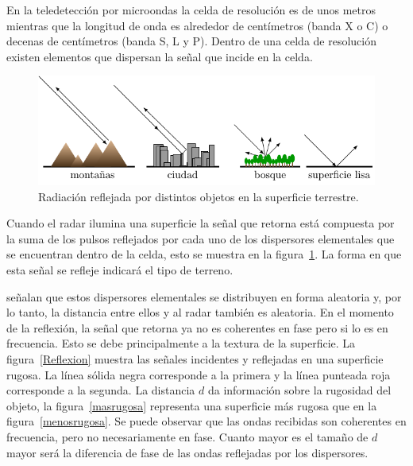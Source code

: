 
En la teledetección por microondas la celda de resolución es de unos metros mientras que la longitud de onda es alrededor de centímetros (banda X o C) o decenas de centímetros (banda S, L y P). Dentro de una celda de resolución existen elementos que dispersan la señal que incide en la celda.

\begin{figure}[hbt]
	\centering    
	\includegraphics[scale=1]{../../Figures/Tesis/Capitulo3/Backscatter2.pdf}
	\caption{\label{Backscatter}Radiación reflejada por distintos objetos en la superficie terrestre.}
\end{figure} 

Cuando el radar ilumina una superficie la señal que retorna está compuesta por la suma de los pulsos reflejados por cada uno de los dispersores elementales que se encuentran dentro de la celda, esto se muestra en la figura~\ref{Backscatter}. La forma en que esta señal se refleje indicará el tipo de terreno.

\citet{Lee2009} señalan que estos dispersores elementales se distribuyen en forma aleatoria y, por lo tanto, la distancia entre ellos y al radar también es aleatoria. 
En el momento de la reflexión, la señal que retorna ya no es coherentes en fase pero si lo es en frecuencia. Esto se debe principalmente a la textura de la superficie. La figura~\ref{Reflexion} muestra las señales incidentes y reflejadas en una superficie rugosa. La línea sólida negra corresponde a la primera y la línea punteada roja corresponde a la segunda. La distancia $d$ da información sobre la rugosidad del objeto, la figura~\ref{masrugosa} representa una superficie más rugosa que en la figura~\ref{menosrugosa}. Se puede observar que las ondas recibidas son coherentes en frecuencia, pero no necesariamente en fase. Cuanto mayor es el tamaño de $d$ mayor será la diferencia de fase de las ondas reflejadas por los dispersores.

